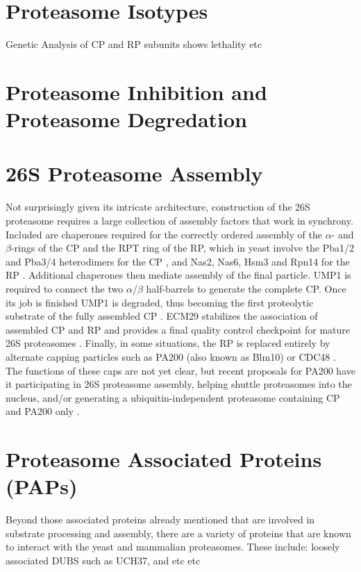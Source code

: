 \section{Proteasome Isotypes}
	Genetic Analysis of CP and RP subunits shows lethality etc


\section{Proteasome Inhibition and Proteasome Degredation}


\section{26S Proteasome Assembly}
	Not surprisingly given its intricate architecture, construction of the 26S proteasome requires a large collection of assembly factors that work in synchrony.  Included are chaperones required for the correctly ordered assembly of the $\alpha$- and $\beta$-rings of the CP and the RPT ring of the RP, which in yeast involve the Pba1/2 and Pba3/4 heterodimers for the CP \citep{kusmierczyk08, le07, tomko13}, and Nas2, Nas6, Hsm3 and Rpn14 for the RP \citep{funakoshi09, roelofs09, saeki09, tomko13}.  Additional chaperones then mediate assembly of the final particle.  UMP1 is required to connect the two $\alpha$/$\beta$ half-barrels to generate the complete CP.  Once its job is finished UMP1 is degraded, thus becoming the first proteolytic substrate of the fully assembled CP \citep{ramos98}.  ECM29 stabilizes the association of assembled CP and RP and provides a final quality control checkpoint for mature 26S proteasomes \citep{besche14, lehmann10}.  Finally, in some situations, the RP is replaced entirely by alternate capping particles such as PA200 (also known as Blm10) or CDC48 \citep{barthelme12, book10, schmidt05}.  The functions of these caps are not yet clear, but recent proposals for PA200 have it participating in 26S proteasome assembly, helping shuttle proteasomes into the nucleus, and/or generating a ubiquitin-independent proteasome containing CP and PA200 only \citep{dange11, sadre-bazzaz10, weberruss13}.


\section{Proteasome Associated Proteins (PAPs)}
Beyond those associated proteins already mentioned that are involved in substrate processing and assembly, there are a variety of proteins that are known to interact with the yeast and mammalian proteasomes. These include: loosely associated DUBS such as UCH37, and etc etc


